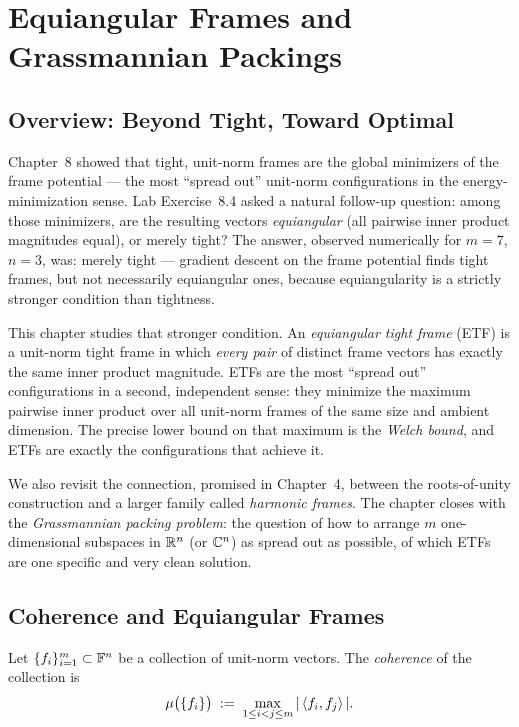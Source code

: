 \chapter{Equiangular Frames and Grassmannian Packings}
\label{ch:etf}
\section{Overview: Beyond Tight, Toward Optimal}
\label{sec:ch9-overview}

Chapter~8 showed that tight, unit-norm frames are the global minimizers
of the frame potential --- the most ``spread out'' unit-norm
configurations in the energy-minimization sense. Lab Exercise~8.4 asked
a natural follow-up question: among those minimizers, are the resulting
vectors \emph{equiangular} (all pairwise inner product magnitudes equal),
or merely tight? The answer, observed numerically for $m=7$, $n=3$, was:
merely tight --- gradient descent on the frame potential finds tight
frames, but not necessarily equiangular ones, because equiangularity is
a strictly stronger condition than tightness.

This chapter studies that stronger condition. An \emph{equiangular tight
frame} (ETF) is a unit-norm tight frame in which \emph{every pair} of
distinct frame vectors has exactly the same inner product magnitude.
ETFs are the most ``spread out'' configurations in a second, independent
sense: they minimize the maximum pairwise inner product over all
unit-norm frames of the same size and ambient dimension. The precise
lower bound on that maximum is the \emph{Welch bound}, and ETFs are
exactly the configurations that achieve it.

We also revisit the connection, promised in Chapter~4, between the
roots-of-unity construction and a larger family called \emph{harmonic
frames}. The chapter closes with the \emph{Grassmannian packing
problem}: the question of how to arrange $m$ one-dimensional subspaces
in $\mathbb{R}^n$ (or $\mathbb{C}^n$) as spread out as possible, of which ETFs are
one specific and very clean solution.

\section{Coherence and Equiangular Frames}
\label{sec:coherence}

\begin{definition}[Coherence]
\label{def:coherence}
Let $\{f_i\}_{i=1}^m \subset \mathbb{F}^n$ be a collection of unit-norm
vectors. The \emph{coherence} of the collection is
\[
  \mu\bigl(\{f_i\}\bigr) \;:=\;
  \max_{1\le i < j \le m} |\left\langle f_i, f_j \right\rangle|.
\]
\end{definition}

